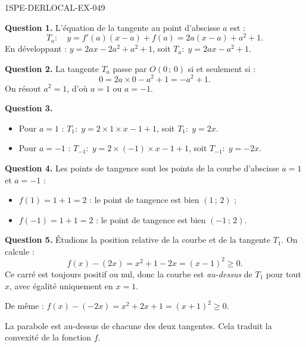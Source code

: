 \begin{corrige}{1SPE-DERLOCAL-EX-049}

\textbf{Question 1.} L'équation de la tangente au point d'abscisse $a$ est :
\[
T_a : \quad y = f'(a)(x - a) + f(a) = 2a(x - a) + a^2 + 1.
\]
En développant : $y = 2ax - 2a^2 + a^2 + 1$, soit $\boxed{T_a : \; y = 2ax - a^2 + 1}$.

\textbf{Question 2.} La tangente $T_a$ passe par $O(0\,;\,0)$ si et seulement si :
\[
0 = 2a \times 0 - a^2 + 1 = -a^2 + 1.
\]
On résout $a^2 = 1$, d'où $\boxed{a = 1 \text{ ou } a = -1}$.

\textbf{Question 3.}
\begin{itemize}
  \item Pour $a = 1$ : $T_1 : \; y = 2 \times 1 \times x - 1 + 1$, soit $\boxed{T_1 : \; y = 2x}$.
  \item Pour $a = -1$ : $T_{-1} : \; y = 2 \times (-1) \times x - 1 + 1$, soit $\boxed{T_{-1} : \; y = -2x}$.
\end{itemize}

\textbf{Question 4.} Les points de tangence sont les points de la courbe d'abscisse $a = 1$ et $a = -1$ :
\begin{itemize}
  \item $f(1) = 1 + 1 = 2$ : le point de tangence est bien $(1\,;\,2)$ ;
  \item $f(-1) = 1 + 1 = 2$ : le point de tangence est bien $(-1\,;\,2)$.
\end{itemize}

\textbf{Question 5.} Étudions la position relative de la courbe et de la tangente $T_1$. On calcule :
\[
f(x) - (2x) = x^2 + 1 - 2x = (x - 1)^2 \geqslant 0.
\]
Ce carré est toujours positif ou nul, donc la courbe est \emph{au-dessus} de $T_1$ pour tout $x$, avec égalité uniquement en $x = 1$.

De même : $f(x) - (-2x) = x^2 + 2x + 1 = (x + 1)^2 \geqslant 0$.

La parabole est au-dessus de chacune des deux tangentes. Cela traduit la convexité de la fonction $f$.

\end{corrige}
